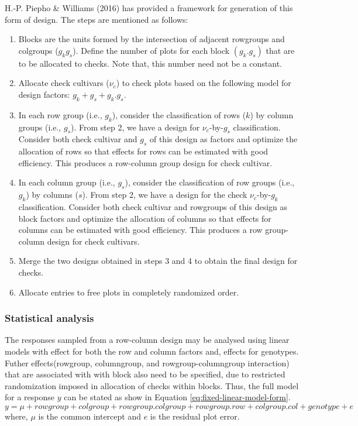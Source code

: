 \documentclass[12pt,oneside]{dukestatscithesis} %
\theoremstyle{definition}
\theoremstyle{definition}
\theoremstyle{definition}
\theoremstyle{remark}
\begin{document}
H.-P. Piepho \& Williams (2016) has provided a framework for generation
of this form of design. The steps are mentioned as follows:
\begin{enumerate}
\def\labelenumi{\arabic{enumi}.}
\item
  Blocks are the units formed by the intersection of adjacent rowgroups
  and colgroups (\(g_kg_s\)). Define the number of plots for each block
  \((g_k.g_s)\) that are to be allocated to checks. Note that, this
  number need not be a constant.
\item
  Allocate check cultivars (\(\nu_c\)) to check plots based on the
  following model for design factors: \(g_k + g_s + g_k.g_s\).
\item
  In each row group (i.e., \(g_k\)), consider the classification of rows
  (\(k\)) by column groups (i.e., \(g_s\)). From step 2, we have a
  design for \(\nu_c\)-by-\(g_s\) classification. Consider both check
  cultivar and \(g_s\) of this design as factors and optimize the
  allocation of rows so that effects for rows can be estimated with good
  efficiency. This produces a row-column group design for check
  cultivar.
\item
  In each column group (i.e., \(g_s\)), consider the classification of
  row groups (i.e., \(g_k\)) by columns (\(s\)). From step 2, we have a
  design for the check \(\nu_c\)-by-\(g_k\) classification. Consider
  both check cultivar and rowgroups of this design as block factors and
  optimize the allocation of columns so that effects for columns can be
  estimated with good efficiency. This produces a row group-column
  design for check cultivars.
\item
  Merge the two designs obtained in steps 3 and 4 to obtain the final
  design for checks.
\item
  Allocate entries to free plots in completely randomized order.
\end{enumerate}
\subsubsection{Statistical analysis}\label{stat-an-aug-row-col}

The responses sampled from a row-column design may be analysed using
linear models with effect for both the row and column factors and,
effects for genotypes. Futher effects(rowgroup, columngroup, and
rowgroup-columngroup interaction) that are associated with with block
also need to be specified, due to restricted randomization imposed in
allocation of checks within blocks. Thus, the full model for a response
\(y\) can be stated as show in Equation
\eqref{eq:fixed-linear-model-form}.
\begin{equation}
y = \mu + rowgroup + colgroup + 
rowgroup.colgroup + rowgroup.row + colgroup.col + 
genotype + e
\label{eq:fixed-linear-model-form}
\end{equation}
where, \(\mu\) is the common intercept and \(e\) is the residual plot
error.
\end{document}
